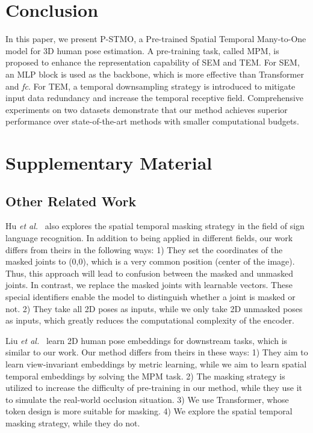 \documentclass[]{llncs}
\begin{document}
\section{Conclusion}

In this paper, we present P-STMO, a Pre-trained Spatial Temporal Many-to-One model for 3D human pose estimation. A pre-training task, called MPM, is proposed to enhance the representation capability of SEM and TEM. For SEM, an MLP block is used as the backbone, which is more effective than Transformer and \emph{fc}. For TEM, a temporal downsampling strategy is introduced to mitigate input data redundancy and increase the temporal receptive field. Comprehensive experiments on two datasets demonstrate that our method achieves superior performance over state-of-the-art methods with smaller computational budgets.




\appendix
\section{Supplementary Material}

\subsection{Other Related Work}
Hu \textit{et al.}~\cite{hu2021signbert} also explores the spatial temporal masking strategy in the field of sign language recognition. In addition to being applied in different fields, our work differs from theirs in the following ways: 1) They set the coordinates of the masked joints to (0,0), which is a very common position (center of the image). Thus, this approach will lead to confusion between the masked and unmasked joints. In contrast, we replace the masked joints with learnable vectors. These special identifiers enable the model to distinguish whether a joint is masked or not. 2) They take all 2D poses as inputs, while we only take 2D unmasked poses as inputs, which greatly reduces the computational complexity of the encoder. 

Liu \textit{et al.}~\cite{liu2022view} learn 2D human pose embeddings for downstream tasks, which is similar to our work. Our method differs from theirs in these ways: 1) They aim to learn view-invariant embeddings by metric learning, while we aim to learn spatial temporal embeddings by solving the MPM task. 2) The masking strategy is utilized to increase the difficulty of pre-training in our method, while they use it to simulate the real-world occlusion situation. 3) We use Transformer, whose token design is more suitable for masking. 4) We explore the spatial temporal masking strategy, while they do not.
\end{document}
